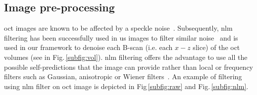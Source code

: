 


\subsection{Image pre-processing}\label{subsec:prepro}

\Ac{oct} images are known to be affected by a speckle noise~\cite{schmitt1999speckle}.
Subsequently, \ac{nlm}~\cite{buades2005non} filtering has been successfully used in \ac{us} images to filter similar noise~\cite{Coupe2009} and is used in our framework to denoise each B-scan (i.e. each $x-z$ slice) of the \ac{oct} volumes (see in Fig.\,\ref{subfig:vol}).
\ac{nlm} filtering offers the advantage to use all the possible self-predictions that the image can provide rather than local or frequency filters such as Gaussian, anisotropic or Wiener filters~\cite{buades2005non}.
An example of filtering using \ac{nlm} filter on \ac{oct} image is depicted in Fig\,\ref{subfig:raw} and Fig.\,\ref{subfig:nlm}.

